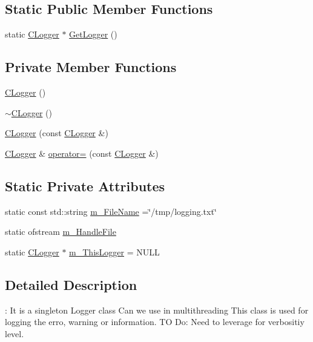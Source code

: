 \subsection*{Static Public Member Functions}
\begin{DoxyCompactItemize}
\item 
static \hyperlink{classCLogger}{C\-Logger} $\ast$ \hyperlink{classCLogger_a9b863cc897927485856833316b2dcffc}{Get\-Logger} ()
\end{DoxyCompactItemize}
\subsection*{Private Member Functions}
\begin{DoxyCompactItemize}
\item 
\hyperlink{classCLogger_a9bee05627064da478ba32af360b8ef19}{C\-Logger} ()
\item 
\hyperlink{classCLogger_ab7006486dce8452e8098c12c3f44c34b}{$\sim$\-C\-Logger} ()
\item 
\hyperlink{classCLogger_ab0ff4aa1fc89d47f7bf4ae6def75d188}{C\-Logger} (const \hyperlink{classCLogger}{C\-Logger} \&)
\item 
\hyperlink{classCLogger}{C\-Logger} \& \hyperlink{classCLogger_adaa3052d7bf54fa8ca0b1b4cc0b95d10}{operator=} (const \hyperlink{classCLogger}{C\-Logger} \&)
\end{DoxyCompactItemize}
\subsection*{Static Private Attributes}
\begin{DoxyCompactItemize}
\item 
static const std\-::string \hyperlink{classCLogger_acdc0bf7adf906120da7dfa947e8de31c}{m\-\_\-\-File\-Name} =\char`\"{}/tmp/logging.\-txt\char`\"{}
\item 
static ofstream \hyperlink{classCLogger_af53cc92a313208f98e82e12c07c42955}{m\-\_\-\-Handle\-File}
\item 
static \hyperlink{classCLogger}{C\-Logger} $\ast$ \hyperlink{classCLogger_aff23c89f945de060b7679e01143bedc1}{m\-\_\-\-This\-Logger} = N\-U\-L\-L
\end{DoxyCompactItemize}


\subsection{Detailed Description}
\-: It is a singleton Logger class Can we use in multithreading This class is used for logging the erro, warning or information. T\-O Do\-: Need to leverage for verbositiy level. 

